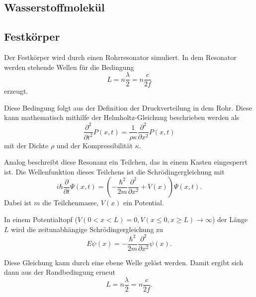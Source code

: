 \subsection{Wasserstoffmolekül}
\label{sec:Wasserstoffmolekül}

\subsection{Festkörper}
\label{sec:Festkörper}
Der Festkörper wird durch einen Rohrresonator simuliert. In dem Resonator werden stehende Wellen für die Bedingung 
\begin{equation*}
    L = n \frac{\lambda}{2} = n \frac{c}{2f}
\end{equation*}
erzeugt. 

Diese Bedingung folgt aus der Definition der Druckverteilung in dem Rohr. Diese kann mathematisch mithilfe der Helmholtz-Gleichung beschrieben werden als 
\begin{equation*}
    \frac{\partial^2}{\partial t^2} P(x,t) = \frac{1}{\rho\kappa}\frac{\partial^2}{\partial x^2} P(x,t)
\end{equation*}
mit der Dichte $\rho$ und der Kompressibilität $\kappa$. 

Analog beschreibt diese Resonanz ein Teilchen, das in einem Kasten eingesperrt ist. 
Die Wellenfunktion dieses Teilchens ist die Schrödingergleichung mit 
\begin{equation*}
    i \hbar \frac{\partial}{\partial t} \Psi(x,t) = \left(- \frac{\hbar^2}{2m} \frac{\partial^2}{\partial x^2} + V(x)\right) \Psi(x,t).
\end{equation*}
Dabei ist $m$ die Teilchenmasse, $V(x)$ ein Potential. 

In einem Potentialtopf ($V(0 < x < L) = 0, V(x \leq 0, x \geq L) \to \infty$) der Länge $L$ wird die zeitunabhängige Schrödingergleichung zu 
\begin{equation*}
    E \psi(x) = - \frac{\hbar^2}{2m} \frac{\partial^2}{\partial x^2} \psi(x).
\end{equation*}

Diese Gleichung kann durch eine ebene Welle gelöst werden. Damit ergibt sich dann aus der Randbedingung erneut
\begin{equation*}
    L = n \frac{\lambda}{2} = n \frac{c}{2f}.
\end{equation*}




